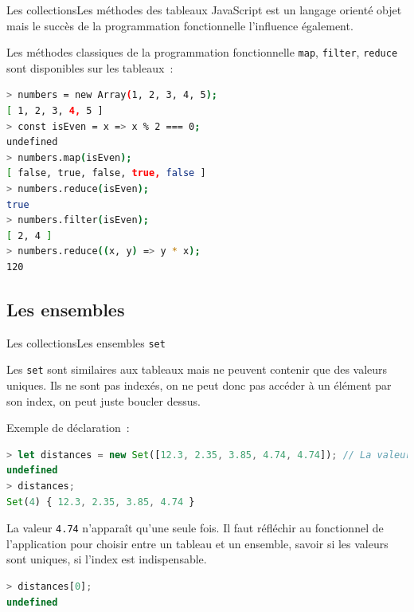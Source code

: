 \documentclass{beamer}
\begin{document}
    \begin{frame}[fragile]{Les collections}{Les méthodes des tableaux}
        JavaScript est un langage orienté objet mais le succès de la programmation fonctionnelle l'influence également.

        Les méthodes classiques de la programmation fonctionnelle \lstinline{map}, \lstinline{filter}, \lstinline{reduce} sont disponibles sur les tableaux~:
        \begin{lstlisting}[language=Bash,title={\scriptsize{Node.js}}]
> numbers = new Array(1, 2, 3, 4, 5);
[ 1, 2, 3, 4, 5 ]
> const isEven = x => x % 2 === 0;
undefined
> numbers.map(isEven);
[ false, true, false, true, false ]
> numbers.reduce(isEven);
true
> numbers.filter(isEven);
[ 2, 4 ]
> numbers.reduce((x, y) => y * x);
120
        \end{lstlisting}
    \end{frame}

    \subsection{Les ensembles}\label{subsec:set}
    \begin{frame}[fragile]{Les collections}{Les ensembles \lstinline{set}}
        \begin{footnotesize}
            Les \lstinline{set} sont similaires aux tableaux mais ne peuvent contenir que des valeurs uniques.
            Ils ne sont pas indexés, on ne peut donc pas accéder à un élément par son index, on peut juste boucler dessus.

            Exemple de déclaration~:
            \begin{lstlisting}[language=JavaScript,title={\scriptsize{Script JavaScript}}]
> let distances = new Set([12.3, 2.35, 3.85, 4.74, 4.74]); // La valeur en double va disparaître
undefined
> distances;
Set(4) { 12.3, 2.35, 3.85, 4.74 }
            \end{lstlisting}
            La valeur \lstinline{4.74} n'apparaît qu'une seule fois.
            \bigbreak
            Il faut réfléchir au fonctionnel de l'application pour choisir entre un tableau et un ensemble, savoir si les valeurs sont uniques, si l'index est indispensable.
            \begin{lstlisting}[language=JavaScript,title={\scriptsize{Script JavaScript}}]
> distances[0];
undefined
            \end{lstlisting}
        \end{footnotesize}
    \end{frame}
\end{document}
